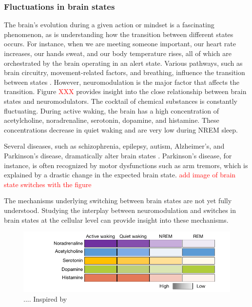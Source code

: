 \subsubsection{Fluctuations in brain states}
The brain's evolution during a given action or mindset is a fascinating phenomenon, as is understanding how the transition between different states occurs. For instance, when we are meeting someone important, our heart rate increases, our hands sweat, and our body temperature rises, all of which are orchestrated by the brain operating in an alert state. Various pathways, such as brain circuitry, movement-related factors, and breathing, influence the transition between states \citep{tantirigama_perspective_2020}. However, neuromodulation is the major factor that affects the transition. Figure \textcolor{red}{XXX} provides insight into the close relationship between brain states and neuromodulators. The cocktail of chemical substances is constantly fluctuating. During active waking, the brain has a high concentration of acetylcholine, noradrenaline, serotonin, dopamine, and histamine. These concentrations decrease in quiet waking and are very low during \acrfull{NREM} sleep.

Several diseases, such as schizophrenia, epilepsy, autism, Alzheimer's, and Parkinson's disease, dramatically alter brain states \citep{uhlhaas_neural_2006, kuhn_event-related_2004, cannon_neurosystems_2014}. Parkinson's disease, for instance, is often recognized by motor dysfunctions such as arm tremors, which is explained by a drastic change in the expected brain state. \textcolor{red}{add image of brain state switches with the figure}

The mechanisms underlying switching between brain states are not yet fully understood. Studying the interplay between neuromodulation and switches in brain states at the cellular level can provide insight into these mechanisms.




\begin{figure}[h!]
\hspace{-1cm}
\includegraphics[scale=1]{latex/fig/Intro/Bgd_NMODinBS.pdf}
\caption{ .... 
Inspired by \citep{tyree_optogenetic_2017} }
\label{fig:intro_tyree_opto}
\end{figure}

